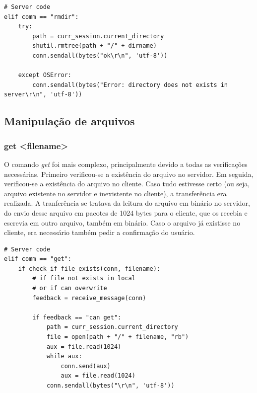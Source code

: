 \documentclass[conference]{IEEEtran}
\begin{document}
\begin{lstlisting}
# Server code
elif comm == "rmdir":
	try:
		path = curr_session.current_directory
	    shutil.rmtree(path + "/" + dirname)
	    conn.sendall(bytes("ok\r\n", 'utf-8'))
	
	except OSError:
	    conn.sendall(bytes("Error: directory does not exists in server\r\n", 'utf-8'))
\end{lstlisting}

\subsection{Manipulação de arquivos}

\subsubsection{get <filename>} O comando \textit{get} foi mais complexo, principalmente devido a todas as verificações necessárias. Primeiro verificou-se a existência do arquivo no servidor. Em seguida, verificou-se a existência do arquivo no cliente. Caso tudo estivesse certo (ou seja, arquivo existente no servidor e inexistente no cliente), a transferência era realizada. A tranferência se tratava da leitura do arquivo em binário no servidor, do envio desse arquivo em pacotes de 1024 bytes para o cliente, que os recebia e escrevia em outro arquivo, também em binário. Caso o arquivo já existisse no cliente, era necessário também pedir a confirmação do usuário.

\begin{lstlisting}
# Server code
elif comm == "get":
	if check_if_file_exists(conn, filename):
		# if file not exists in local
		# or if can overwrite
	    feedback = receive_message(conn)

	    if feedback == "can get":
			path = curr_session.current_directory
			file = open(path + "/" + filename, "rb")
			aux = file.read(1024)
			while aux:
		    	conn.send(aux)
		    	aux = file.read(1024)
			conn.sendall(bytes("\r\n", 'utf-8'))
\end{lstlisting}
\end{document}

